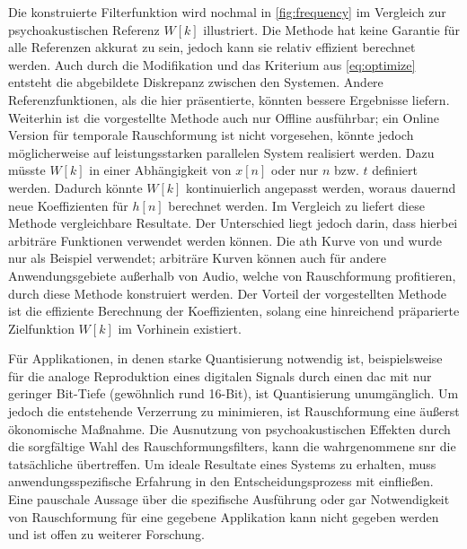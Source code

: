 Die konstruierte Filterfunktion wird nochmal in \autoref{fig:frequency} im Vergleich zur psychoakustischen Referenz $W[k]$ illustriert.
Die Methode hat keine Garantie für alle Referenzen akkurat zu sein, jedoch kann sie relativ effizient berechnet werden.
Auch durch die Modifikation und das Kriterium aus \autoref{eq:optimize} entsteht die abgebildete Diskrepanz zwischen den Systemen.
Andere Referenzfunktionen, als die hier präsentierte, könnten bessere Ergebnisse liefern.
Weiterhin ist die vorgestellte Methode auch nur Offline ausführbar; ein Online Version für temporale Rauschformung ist nicht vorgesehen, könnte jedoch möglicherweise auf leistungsstarken parallelen System realisiert werden.
Dazu müsste $W[k]$ in einer Abhängigkeit von $x[n]$ oder nur $n$ bzw. $t$ definiert werden.
Dadurch könnte $W[k]$ kontinuierlich angepasst werden, woraus dauernd neue Koeffizienten für $h[n]$ berechnet werden.
Im Vergleich zu \citeauthor{noise-shaping} \autocite{noise-shaping} liefert diese Methode vergleichbare Resultate.
Der Unterschied liegt jedoch darin, dass hierbei arbiträre Funktionen verwendet werden können.
Die \gls{ath} Kurve von  \autocite{iso226} und \citeauthor{iso226matlab} \autocite{iso226matlab} wurde nur als Beispiel verwendet;
arbiträre Kurven können auch für andere Anwendungsgebiete außerhalb von Audio, welche von Rauschformung profitieren, durch diese Methode konstruiert werden.
Der Vorteil der vorgestellten Methode ist die effiziente Berechnung der Koeffizienten, solang eine hinreichend präparierte Zielfunktion $W[k]$ im Vorhinein existiert.

Für Applikationen, in denen starke Quantisierung notwendig ist, beispielsweise für die analoge Reproduktion eines digitalen Signals durch einen \gls{dac} mit nur geringer Bit-Tiefe (gewöhnlich rund 16-Bit), ist Quantisierung unumgänglich.
Um jedoch die entstehende Verzerrung zu minimieren, ist Rauschformung eine äußerst ökonomische Maßnahme.
Die Ausnutzung von psychoakustischen Effekten durch die sorgfältige Wahl des Rauschformungsfilters, kann die wahrgenommene \gls{snr} die tatsächliche übertreffen.
Um ideale Resultate eines Systems zu erhalten, muss anwendungsspezifische Erfahrung in den Entscheidungsprozess mit einfließen.
Eine pauschale Aussage über die spezifische Ausführung oder gar Notwendigkeit von Rauschformung für eine gegebene Applikation kann nicht gegeben werden und ist offen zu weiterer Forschung.

